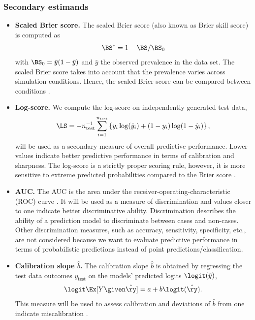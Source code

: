\begin{subappendices}
\subsubsection{Secondary estimands}
\begin{itemize}
  \item \textbf{Scaled Brier score.} The scaled Brier score (also known as Brier
        skill score) is computed as
  $$\BS^{*} = 1 - \BS/\BS_{0}$$
        with $\BS_{0} = \bar{y}(1 - \bar{y})$ and $\bar{y}$ the observed
        prevalence in the data set. The scaled Brier score takes into account
        that the prevalence varies across simulation conditions. Hence, the
        scaled Brier score can be compared between conditions \citep{Schmid2005,
        Steyerberg2019}.

  \item \textbf{Log-score.} We compute the log-score on independently generated test data,
  $$\LS = - n_{\text{test}}^{-1} \sum_{i=1}^{n_{\text{test}}} \left\{ y_{i} \log(\hat{y}_{i})
        + (1 - y_{i}) \log (1 - \hat{y}_{i})\right\},$$ will be used as a
        secondary measure of overall predictive performance. Lower values
        indicate better predictive performance in terms of calibration and
        sharpness. The log-score is a strictly proper scoring rule, however, it
        is more sensitive to extreme predicted probabilities compared to the
        Brier score \citep{Gneiting2007}.

  \item \textbf{AUC.} The AUC is the area under the
        receiver-operating-characteristic (ROC) curve \citep{Steyerberg2019}. It
        will be used as a measure of discrimination and values closer to one
        indicate better discriminative ability. Discrimination describes the
        ability of a prediction model to discriminate between cases and
        non-cases. Other discrimination measures, such as accuracy, sensitivity,
        specificity, etc., are not considered because we want to evaluate
        predictive performance in terms of probabilistic predictions instead of
        point predictions/classification.

  \item \textbf{Calibration slope $\hat b$.} The calibration slope $\hat b$ is
        obtained by regressing the test data outcomes $y_{\text{test}}$ on the
        models' predicted logits $\logit({\hat{y}})$, \ie
  $$\logit\Ex[Y \given \hat\ry] = a + b\logit(\hat\ry).$$
        This measure will be used to assess calibration and deviations of
        $\hat b$ from one indicate miscalibration \citep{Steyerberg2019}.


\end{itemize}
\end{subappendices}
